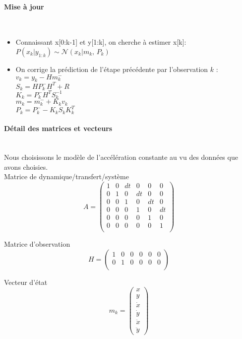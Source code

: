 \paragraph{Mise à jour} 
~~\\
\begin{itemize}
	\item[] Connaissant x[0:k-1] et y[1:k], on cherche à estimer x[k]: \\
	$P(x_k|y_{1:k}) \sim \mathcal{N}(x_k|m_k,\,P_k)\,$
	\item[] On corrige la prédiction de l'étape précédente par l'observation $k$ : \\
	$v_k=y_k-Hm_k^-$ \\
	$S_k = HP_k^-H^T+R$ \\
	$K_k = P_k^-H^TS_k^{-1}$ \\
	$m_k=m_k^-+K_kv_k$ \\
	$P_k=P_k^- - K_kS_kK_k^T$ \\
\end{itemize}

\paragraph{Détail des matrices et vecteurs}
~~\\
Nous choisissons le modèle de l'accélération constante au vu des données que avons choisies. \\

Matrice de dynamique/transfert/système
\[ A=\begin{pmatrix}
	1 & 0 & dt & 0 & 0 & 0 \\
	0 & 1 & 0 & dt & 0 & 0 \\
	0 & 0 & 1 & 0 & dt & 0 \\
	0 & 0 & 0 & 1 & 0 & dt \\
	0 & 0 & 0 & 0 & 1 & 0 \\
	0 & 0 & 0 & 0 & 0 & 1 \\
\end{pmatrix} \] 

Matrice d'observation
\[ H= \begin{pmatrix}
	1 & 0 & 0 & 0 & 0 & 0 \\
	0 & 1 & 0 & 0 & 0 & 0 \\
\end{pmatrix} \]

Vecteur d'état
\[m_k=\begin{pmatrix}
	x \\
	y \\
	\dot{x} \\
	\dot{y} \\
	\ddot{x} \\
	\ddot{y}
\end{pmatrix}\] 

